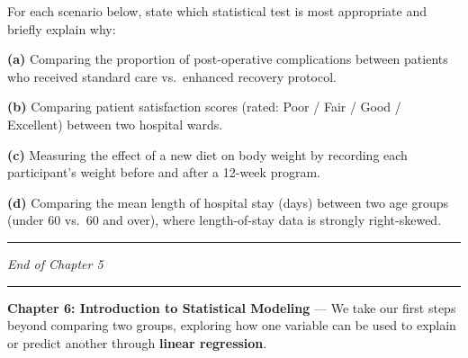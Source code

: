 \documentclass[
  12pt,
  letterpaper,
]{book}
\begin{document}
\begin{tcolorbox}[enhanced jigsaw, arc=.35mm, bottomrule=.15mm, bottomtitle=1mm, breakable, colback=white, colbacktitle=quarto-callout-caution-color!10!white, colframe=quarto-callout-caution-color-frame, coltitle=black, left=2mm, leftrule=.75mm, opacityback=0, opacitybacktitle=0.6, rightrule=.15mm, title={✏️ Exercise 4 --- Choosing the Right Test}, titlerule=0mm, toprule=.15mm, toptitle=1mm]

For each scenario below, state which statistical test is most
appropriate and briefly explain why:

\textbf{(a)} Comparing the proportion of post-operative complications
between patients who received standard care vs.~enhanced recovery
protocol.

\textbf{(b)} Comparing patient satisfaction scores (rated: Poor / Fair /
Good / Excellent) between two hospital wards.

\textbf{(c)} Measuring the effect of a new diet on body weight by
recording each participant's weight before and after a 12-week program.

\textbf{(d)} Comparing the mean length of hospital stay (days) between
two age groups (under 60 vs.~60 and over), where length-of-stay data is
strongly right-skewed.

\end{tcolorbox}

\begin{center}\rule{0.5\linewidth}{0.5pt}\end{center}

\emph{End of Chapter 5}

\begin{center}\rule{0.5\linewidth}{0.5pt}\end{center}

\begin{tcolorbox}[enhanced jigsaw, arc=.35mm, bottomrule=.15mm, bottomtitle=1mm, breakable, colback=white, colbacktitle=quarto-callout-note-color!10!white, colframe=quarto-callout-note-color-frame, coltitle=black, left=2mm, leftrule=.75mm, opacityback=0, opacitybacktitle=0.6, rightrule=.15mm, title={📚 Coming Up Next}, titlerule=0mm, toprule=.15mm, toptitle=1mm]

\textbf{Chapter 6: Introduction to Statistical Modeling} --- We take our
first steps beyond comparing two groups, exploring how one variable can
be used to explain or predict another through \textbf{linear
regression}.

\end{tcolorbox}
\end{document}
